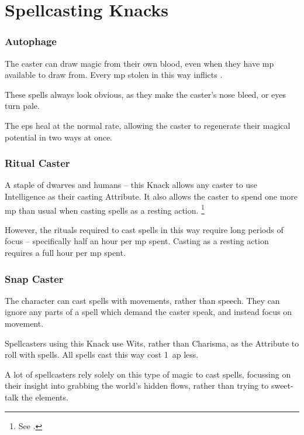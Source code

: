 \section{Spellcasting Knacks}

\begin{multicols}{2}

\subsubsection{Autophage}

The caster can draw magic from their own blood, even when they have \gls{mp} available to draw from.
Every \gls{mp} stolen in this way inflicts .

These spells always look obvious, as they make the caster's nose bleed, or eyes turn pale.

The \glspl{ep} heal at the normal rate, allowing the caster to regenerate their magical potential in two ways at once.

\subsubsection{Ritual Caster}
\label{ritualCaster}

A staple of dwarves and humans -- this Knack allows any caster to use Intelligence as their casting Attribute.
It also allows the caster to spend one more \gls{mp} than usual when casting spells as a resting action.%
\footnote{See .}

However, the rituals required to cast spells in this way require long periods of focus -- specifically half an hour per \gls{mp} spent.
Casting as a resting action requires a full hour per \gls{mp} spent.

\subsubsection{Snap Caster}
\label{snapCaster}

The character can cast spells with movements, rather than speech.
They can ignore any parts of a spell which demand the caster speak, and instead focus on movement.

Spellcasters using this Knack use Wits, rather than Charisma, as the Attribute to roll with spells.
All spells cast this way cost 1~\gls{ap} less.

A lot of spellcasters rely solely on this type of magic to cast spells, focussing on their insight into grabbing the world's hidden flows, rather than trying to sweet-talk the elements.


\end{multicols}
